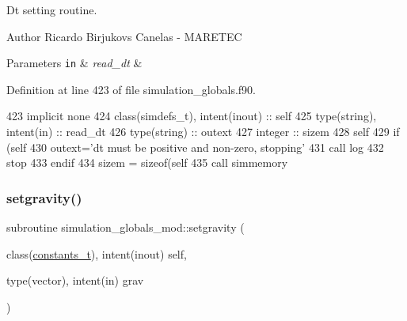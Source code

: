 Dt setting routine. 

\begin{DoxyAuthor}{Author}
Ricardo Birjukovs Canelas -\/ M\+A\+R\+E\+T\+EC
\end{DoxyAuthor}

\begin{DoxyParams}[1]{Parameters}
\mbox{\tt in}  & {\em read\+\_\+dt} & \\
\hline
\end{DoxyParams}


Definition at line 423 of file simulation\+\_\+globals.\+f90.


\begin{DoxyCode}
423     \textcolor{keywordtype}{implicit none}
424     \textcolor{keywordtype}{class}(simdefs\_t), \textcolor{keywordtype}{intent(inout)} :: self
425     \textcolor{keywordtype}{type}(string), \textcolor{keywordtype}{intent(in)} :: read\_dt
426     \textcolor{keywordtype}{type}(string) :: outext
427     \textcolor{keywordtype}{integer} :: sizem
428     self%
429     \textcolor{keywordflow}{if} (self%
430         outext=\textcolor{stringliteral}{'dt must be positive and non-zero, stopping'}
431         \textcolor{keyword}{call }log%
432         stop
433 \textcolor{keywordflow}{    endif}
434     sizem = sizeof(self%
435     \textcolor{keyword}{call }simmemory%
\end{DoxyCode}
\mbox{\label{namespacesimulation__globals__mod_a9e92dfed4ef7388208adce768f064554}} 
\subsubsection{\texorpdfstring{setgravity()}{setgravity()}}
{\footnotesize\ttfamily subroutine simulation\+\_\+globals\+\_\+mod\+::setgravity (\begin{DoxyParamCaption}\item[{class(\mbox{\hyperlink{structsimulation__globals__mod_1_1constants__t}{constants\+\_\+t}}), intent(inout)}]{self,  }\item[{type(vector), intent(in)}]{grav }\end{DoxyParamCaption})\hspace{0.3cm}{\ttfamily [private]}}



